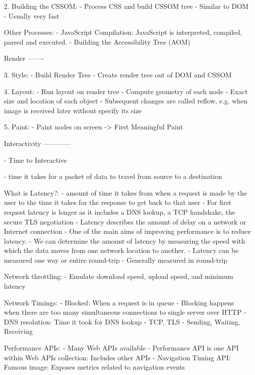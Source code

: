 2. Building the CSSOM:
- Process CSS and build CSSOM tree
- Similar to DOM
- Usually very fast


Other Processes:
- JavaScript Compilation: JavaScript is interpreted, compiled, parsed and executed.
- Building the Accessibility Tree (AOM)


Render
-------

3. Style:
- Build Render Tree
- Create render tree out of DOM and CSSOM

4. Layout:
- Run layout on render tree
- Compute geometry of each node
- Exact size and location of each object
- Subsequent changes are called reflow, e.g. when image is received later without specify its size

5. Paint:
- Paint nodes on screen
-> First Meaningful Paint


Interactivity
------------

- Time to Interactive




- time it takes for a packet of data to travel from source to a destination

What is Latency?:
- amount of time it takes from when a request is made by the user to the time it takes for the response to get back to that user
- For first request latency is longer as it includes a DNS lookup, a TCP handshake, the secure TLS negotiation
- Latency describes the amount of delay on a network or Internet connection
- One of the main aims of improving performance is to reduce latency.
- We can determine the amount of latency by measuring the speed with which the data moves from one network location to another.
- Latency can be measured one way or entire round-trip
- Generally measured in round-trip


Network throttling:
- Emulate download speed, upload speed, and minimum latency


Network Timings:
- Blocked: When a request is in queue
- Blocking happens when there are too many simultaneous connections to single server over HTTP
- DNS resolution: Time it took for DNS lookup
- TCP, TLS
- Sending, Waiting, Receiving




Performance APIs:
- Many Web APIs available %
- Performance API is one API within Web APIs collection: Includes other APIs
- Navigation Timing API: Famous image: Exposes metrics related to navigation events

